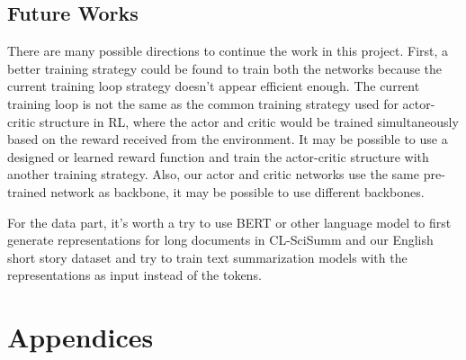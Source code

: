 \documentclass[11pt,a4paper]{article}
\begin{document}
\subsection{Future Works}

There are many possible directions to continue the work in this project. First, a better training strategy could be found to train both the networks because the current training loop strategy doesn't appear efficient enough. The current training loop is not the same as the common training strategy used for actor-critic structure in RL, where the actor and critic would be trained simultaneously based on the reward received from the environment. It may be possible to use a designed or learned reward function and train the actor-critic structure with another training strategy. Also, our actor and critic networks use the same pre-trained network as backbone, it may be possible to use different backbones.

For the data part, it's worth a try to use BERT or other language model to first generate representations for long documents in CL-SciSumm and our English short story dataset and try to train text summarization models with the representations as input instead of the tokens.




\appendix
\onecolumn
\section{Appendices}
\label{sec:appendix}
\end{document}

